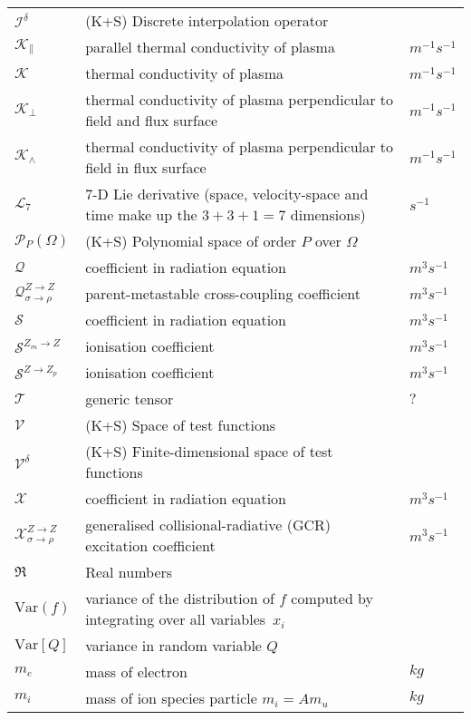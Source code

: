 \begin{longtable}{|p{3.0cm}|p{10.0cm}|p{3.0cm}|}
$\mathcal{I}^{\delta}$ &  (K+S) Discrete interpolation operator & \\
$\mathcal{K}_{\|}$ & parallel thermal conductivity of plasma & $m^{-1}s^{-1}$ \\
$\mathcal{K}$ & thermal conductivity of plasma & $m^{-1}s^{-1}$ \\
$\mathcal{K}_{\perp}$ & thermal conductivity of plasma perpendicular to field and flux surface & $m^{-1}s^{-1}$ \\
$\mathcal{K}_{\wedge}$ & thermal conductivity of plasma perpendicular to field in flux surface & $m^{-1}s^{-1}$ \\
$\mathcal{L}_7$ & 7-D Lie derivative (space, velocity-space and time make up the $3+3+1=7$ dimensions)  & $s^{-1}$ \\
$\mathcal{P}_{P}(\Omega)$ &  (K+S) Polynomial space of order $P$ over $\Omega$ & \\
$\mathcal{Q}$ & coefficient in radiation equation  & $m^3 s^{-1}$ \\
$\mathcal{Q}_{\sigma \rightarrow \rho}^{Z\rightarrow Z}$ & parent-metastable cross-coupling coefficient  & $m^3 s^{-1}$ \\
$\mathcal{S}$ & coefficient in radiation equation  & $m^3 s^{-1}$ \\
$\mathcal{S}^{Z_m\rightarrow Z}$ & ionisation coefficient  & $m^3 s^{-1}$ \\
$\mathcal{S}^{Z\rightarrow Z_p}$ & ionisation coefficient  & $m^3 s^{-1}$ \\
$\mathcal{T}$ & generic tensor & $?$ \\
$\mathcal{V}$ &  (K+S) Space of test functions & \\
$\mathcal{V}^{\delta}$ &  (K+S) Finite-dimensional space of test functions & \\
$\mathcal{X}$ & coefficient in radiation equation  & $m^3 s^{-1}$ \\
$\mathcal{X}_{\sigma \rightarrow \rho}^{Z\rightarrow Z}$ & generalised collisional-radiative (GCR) excitation coefficient  & $m^3 s^{-1}$ \\
$\mathfrak{R}$ & Real numbers & \\
$\mathrm{Var}(f)$ & variance of the distribution of $f$ computed by integrating over all variables~$x_i$  & \\
$\mathrm{Var}[Q]$ & variance in random variable $Q$  & \\
$m_e$ & mass of electron & $kg$ \\
$m_i$ & mass of ion species particle $m_i= A m_u$ & $kg$ \\

\end{longtable}
